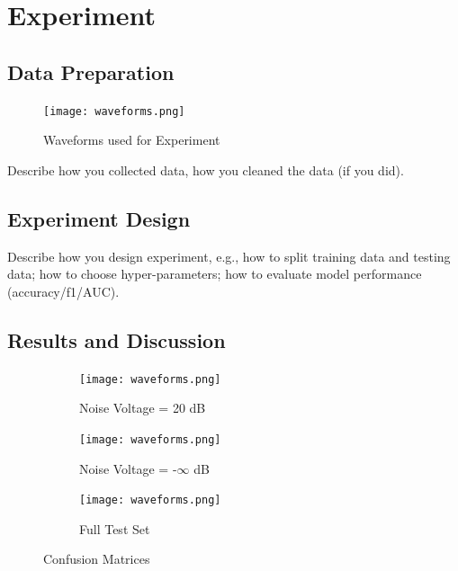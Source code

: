 \documentclass{article}
\begin{document}
\section{Experiment}

\subsection{Data Preparation}

\begin{figure}[H]
    \centering
    \texttt{[image: waveforms.png]}
    \caption{Waveforms used for Experiment}
    \label{fig:waveforms}
\end{figure}


Describe how you collected data, how
you cleaned the data (if you did).

\subsection{Experiment Design}


Describe how you design experiment,
e.g., how to split training data and testing
data; how to choose hyper-parameters; how
to evaluate model performance (accuracy/f1/AUC).

\subsection{Results and Discussion}

\begin{figure}[H]
    \centering
    \begin{subfigure}[b]{0.3\textwidth}
        \centering
        \texttt{[image: waveforms.png]}
        \caption{Noise Voltage = 20 dB}
        \label{fig:noise voltage = 20 dB}
    \end{subfigure}
    \hfill
    \begin{subfigure}[b]{0.3\textwidth}
        \centering
        \texttt{[image: waveforms.png]}
        \caption{Noise Voltage = -$\infty$ dB}
        \label{fig:noise voltage = 0}
    \end{subfigure}
    \hfill
    \begin{subfigure}[b]{0.3\textwidth}
        \centering
        \texttt{[image: waveforms.png]}
        \caption{Full Test Set}
        \label{fig:full test set}
    \end{subfigure}
       \caption{Confusion Matrices}
       \label{fig:confusion}
\end{figure}
\end{document}
